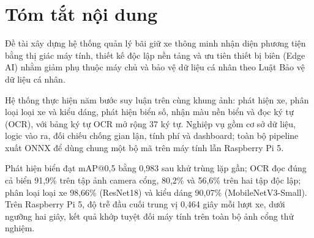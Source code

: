 \chapter*{Tóm tắt nội dung}

Đề tài
xây dựng hệ thống quản lý bãi giữ xe thông minh nhận diện phương tiện bằng thị giác máy
tính, thiết kế độc lập nền tảng và ưu tiên thiết bị biên (Edge AI) nhằm giảm phụ thuộc
máy chủ và bảo vệ dữ liệu cá nhân theo Luật Bảo vệ dữ liệu cá nhân.

Hệ thống thực hiện năm bước suy luận trên cùng khung ảnh: phát hiện xe, phân loại loại
xe và kiểu dáng, phát hiện biển số, nhận màu nền biển và đọc ký tự (OCR), với bảng ký
tự OCR mở rộng 37 ký tự. Nghiệp vụ gồm cơ sở dữ liệu, logic vào
ra, đối chiếu chống gian lận, tính phí và dashboard; toàn bộ pipeline xuất ONNX để dùng
chung một bộ mã trên máy tính lẫn Raspberry Pi 5.

Phát hiện biển đạt mAP@0,5 bằng 0,983 sau khử trùng lặp gần; OCR đọc đúng cả biển
91,9\% trên tập ảnh camera cổng, 80,2\% và 56,6\% trên hai tập độc lập; phân loại loại
xe 98,66\% (ResNet18) và kiểu dáng 90,07\% (MobileNetV3-Small). Trên Raspberry Pi 5, độ
trễ đầu cuối trung vị 0,464 giây mỗi lượt xe, dưới ngưỡng hai giây, kết quả khớp tuyệt
đối máy tính trên toàn bộ ảnh cổng thử nghiệm.
